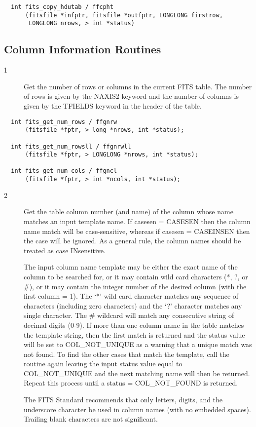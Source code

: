 \documentclass[11pt]{book}
\begin{document}
\begin{verbatim}
  int fits_copy_hdutab / ffcpht
      (fitsfile *infptr, fitsfile *outfptr, LONGLONG firstrow,
       LONGLONG nrows, > int *status)
\end{verbatim}



\subsection{Column Information Routines}


\begin{description}
\item[1 ]  Get the number of rows or columns in the current FITS table.
     The number of rows is given by the NAXIS2 keyword and the
     number of columns is given by the TFIELDS keyword in the header
    of the table. \label{ffgnrw}
\end{description}

\begin{verbatim}
  int fits_get_num_rows / ffgnrw
      (fitsfile *fptr, > long *nrows, int *status);

  int fits_get_num_rowsll / ffgnrwll
      (fitsfile *fptr, > LONGLONG *nrows, int *status);

  int fits_get_num_cols / ffgncl
      (fitsfile *fptr, > int *ncols, int *status);
\end{verbatim}


\begin{description}
\item[2 ] Get the table column number (and name) of the column whose name
matches an input template name.   If casesen  = CASESEN then the column
name match will be case-sensitive, whereas if casesen = CASEINSEN then
the case will be ignored.  As a general rule, the column names should
be treated as case INsensitive.

The input column name template may be either the exact name of the
column to be searched for, or it may contain wild card characters (*,
?, or \#), or it may contain the integer number of the desired column
(with the first column = 1).  The `*' wild card character matches any
sequence of characters (including zero characters) and the `?'
character matches any single character.  The \# wildcard will match any
consecutive string of decimal digits (0-9).  If more than one column
name in the table matches the template string, then the first match is
returned and the status value will be set to COL\_NOT\_UNIQUE  as a
warning that a unique match was not found.  To find the other cases
that match the template, call the routine again leaving the input
status value equal to COL\_NOT\_UNIQUE and the next matching name will
then be returned.  Repeat this process until a status =
COL\_NOT\_FOUND  is returned.

The FITS Standard recommends that only letters, digits, and the
underscore character be used in column names (with no embedded
spaces).  Trailing blank characters are not significant.
  \label{ffgcno} \label{ffgcnn}
\end{description}
\end{document}
